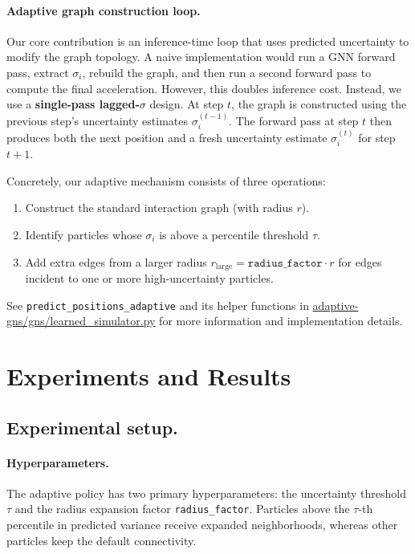 \documentclass{article}
\begin{document}
\paragraph{Adaptive graph construction loop.} Our core contribution is an inference-time loop that uses predicted uncertainty to modify the graph topology. A naive implementation would run a GNN forward pass, extract
$\sigma_i$, rebuild the graph, and then run a second forward pass to compute
the final acceleration. However, this doubles inference cost. Instead, we use a \textbf{single-pass lagged-$\sigma$} design. At step
$t$, the graph is constructed using the previous step's uncertainty estimates
$\sigma_i^{(t-1)}$. The forward pass at step $t$ then produces both the next
position and a fresh uncertainty estimate $\sigma_i^{(t)}$ for
step $t + 1$. 

Concretely, our adaptive mechanism consists of three operations:
\begin{enumerate}
    \item Construct the standard interaction graph (with radius $r$).
    \item Identify particles whose $\sigma_i$ is above a
    percentile threshold $\tau$.
    \item Add extra edges from a larger radius
    $r_{\text{large}} = \texttt{radius\_factor} \cdot r$ for edges incident to one or more high-uncertainty particles.
\end{enumerate}
See \texttt{predict\_positions\_adaptive} and its helper functions in \url{adaptive-gns/gns/learned_simulator.py} for more information and implementation details.
\section{Experiments and Results}

\subsection{Experimental setup.}

\paragraph{Hyperparameters.}
The adaptive policy has two primary hyperparameters: the uncertainty
threshold $\tau$ and the radius expansion factor \texttt{radius\_factor}. Particles
above the $\tau$-th percentile in predicted variance receive expanded
neighborhoods, whereas other particles keep the default connectivity.
\end{document}
